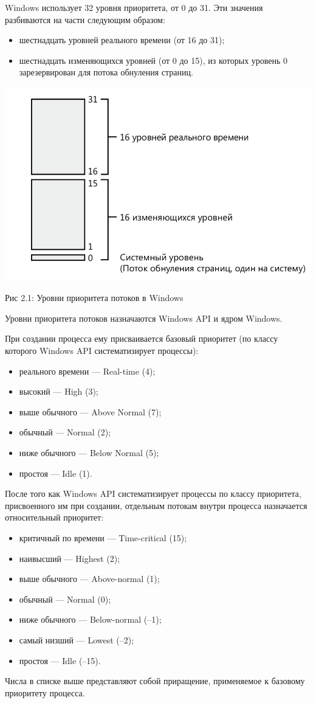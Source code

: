 \documentclass[12pt]{report}
\begin{document}
Windows использует 32 уровня приоритета, от 0 до 31. Эти значения разбиваются на части следующим образом:
\begin{itemize}
\item шестнадцать уровней реального времени (от 16 до 31);
\item шестнадцать изменяющихся уровней (от 0 до 15), из которых уровень 0 зарезервирован для потока обнуления страниц.
\end{itemize}

\begin{center}
		\includegraphics[scale=0.6]{pics/Wind_priority.png}
		
			Рис 2.1: Уровни приоритета потоков в Windows
\end{center}

Уровни приоритета потоков назначаются Windows API и ядром Windows. 

При создании процесса ему присваивается базовый приоритет (по классу которого Windows API систематизирует процессы):
\begin{itemize}
\item реального времени — Real-time (4);
\item высокий — High (3);
\item выше обычного — Above Normal (7);
\item обычный — Normal (2);
\item ниже обычного — Below Normal (5);
\item простоя — Idle (1).
\end{itemize}

После того как  Windows API систематизирует процессы по классу приоритета, присвоенного им при создании, отдельным потокам внутри процесса назначается относительный приоритет:
\begin{itemize}
\item критичный по времени — Time-critical (15);  
\item наивысший — Highest (2);
\item выше обычного — Above-normal (1);
\item обычный — Normal (0);
\item ниже обычного — Below-normal (–1);
\item самый низший — Lowest (–2);
\item простоя — Idle (–15).
\end{itemize}
Числа в списке выше представляют собой приращение, применяемое к базовому приоритету процесса.
\end{document}
